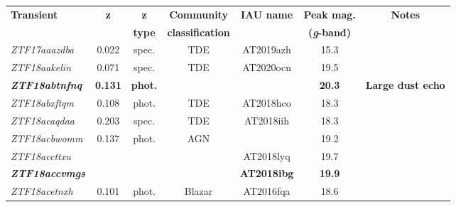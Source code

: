 \begin{table*}
  \begin{tabular}{l  c  c  c   c  c  c}
    \hline
    \textbf{Transient}             & \textbf{z}     & \textbf{z}     & \textbf{Community}      & \textbf{IAU name}   & \textbf{Peak mag.}         & \textbf{Notes}                      \\
                                   &                & \textbf{type}  & \textbf{classification} &                     & \textbf{(\textit{g}-band)} &                                     \\
    \hline
    \hline
    \textit{ZTF17aaazdba}          & 0.022          & spec.          & TDE                     & AT2019azh           & 15.3                       &                                     \\
    \textit{ZTF18aakelin}          & 0.071          & spec.          & TDE                     & AT2020ocn           & 19.5                       &                                     \\
    \textbf{\textit{ZTF18abtnfnq}} & \textbf{0.131} & \textbf{phot.} & ~                       & ~                   & \textbf{20.3}              & \textbf{Large dust echo}            \\
    \textit{ZTF18abxftqm}          & 0.108          & phot.          & TDE                     & AT2018hco           & 18.3                       &                                     \\
    \textit{ZTF18acaqdaa}          & 0.203          & spec.          & TDE                     & AT2018iih           & 18.3                       &                                     \\
    \textit{ZTF18acbwomm}          & 0.137          & phot.          & AGN                     & ~                   & 19.2                       &                                     \\
    \textit{ZTF18accttxu}          & ~              & ~              & ~                       & AT2018lyq           & 19.7                       &                                     \\
    \textbf{\textit{ZTF18accvmgs}} & ~              & ~              & ~                       & \textbf{AT2018ibg}  & \textbf{19.9      }        &                                     \\
    \textit{ZTF18acetnxh}          & 0.101          & phot.          & Blazar                  & AT2016fqa           & 18.6                       &                                     \\

\end{tabular}
\end{table*}

